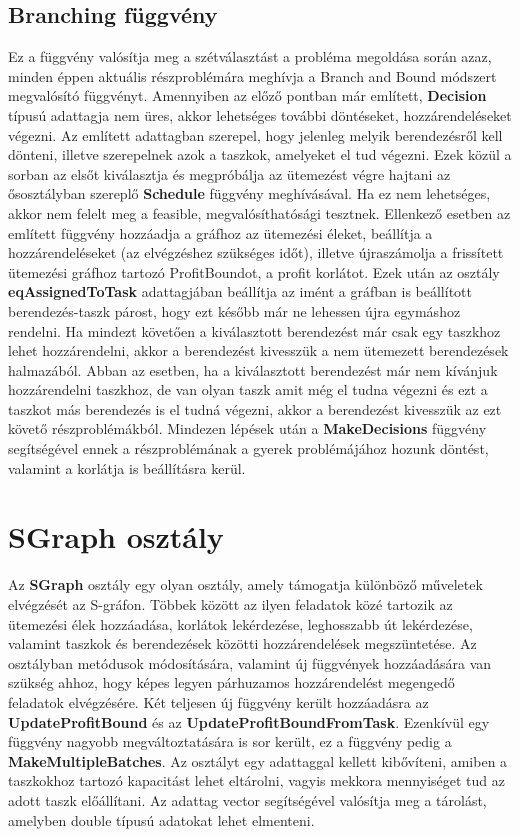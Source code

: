 \subsection{Branching függvény}
Ez a függvény valósítja meg a szétválasztást a probléma megoldása során azaz, minden éppen aktuális részproblémára meghívja a Branch and Bound módszert megvalósító függvényt. Amennyiben az előző pontban már említett, \textbf{Decision} típusú adattagja nem üres, akkor lehetséges további döntéseket, hozzárendeléseket végezni. Az említett adattagban szerepel, hogy jelenleg melyik berendezésről kell dönteni, illetve szerepelnek azok a taszkok, amelyeket el tud végezni. Ezek közül a sorban az elsőt kiválasztja és megpróbálja az ütemezést végre hajtani az ősosztályban szereplő \textbf{Schedule} függvény meghívásával. Ha ez nem lehetséges, akkor nem felelt meg a feasible, megvalósíthatósági tesztnek. Ellenkező esetben az említett függvény hozzáadja a gráfhoz az ütemezési éleket, beállítja a hozzárendeléseket (az elvégzéshez szükséges időt), illetve újraszámolja a frissített ütemezési gráfhoz tartozó ProfitBoundot, a profit korlátot. Ezek után az osztály \textbf{eqAssignedToTask} adattagjában beállítja az imént a gráfban is beállított berendezés-taszk párost, hogy ezt később már ne lehessen újra egymáshoz rendelni. Ha mindezt követően a kiválasztott berendezést már csak egy taszkhoz lehet hozzárendelni, akkor a berendezést kivesszük a nem ütemezett berendezések halmazából. Abban az esetben, ha a kiválasztott berendezést már nem kívánjuk hozzárendelni taszkhoz, de van olyan taszk amit még el tudna végezni és ezt a taszkot más berendezés is el tudná végezni, akkor a berendezést kivesszük az ezt követő részproblémákból. Mindezen lépések után a \textbf{MakeDecisions} függvény segítségével ennek a részproblémának a gyerek problémájához hozunk döntést, valamint a korlátja is beállításra kerül.

\section{SGraph osztály}
Az \textbf{SGraph} osztály egy olyan osztály, amely támogatja különböző műveletek elvégzését az S-gráfon. Többek között az ilyen feladatok közé tartozik az ütemezési élek hozzáadása, korlátok lekérdezése, leghosszabb út lekérdezése, valamint taszkok és berendezések közötti hozzárendelések megszüntetése. Az osztályban metódusok módosítására, valamint új függvények hozzáadására van szükség ahhoz, hogy képes legyen párhuzamos hozzárendelést megengedő feladatok elvégzésére. Két teljesen új függvény került hozzáadásra az \textbf{UpdateProfitBound} és az \textbf{UpdateProfitBoundFromTask}. Ezenkívül egy függvény nagyobb megváltoztatására is sor került, ez a függvény pedig a \textbf{MakeMultipleBatches}. Az osztályt egy adattaggal kellett kibővíteni, amiben a taszkokhoz tartozó kapacitást lehet eltárolni, vagyis mekkora mennyiséget tud az adott taszk előállítani. Az adattag vector segítségével valósítja meg a tárolást, amelyben double típusú adatokat lehet elmenteni.
